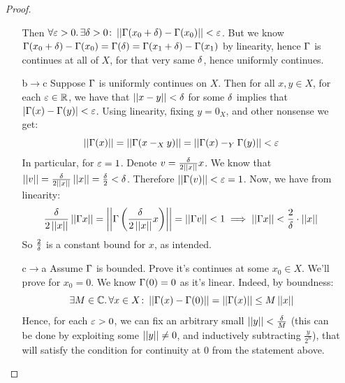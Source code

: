 \documentclass[a4paper]{article}
\begin{document}
\begin{enumerate}
\begin{proof}
\begin{itemize}
				Then $\forall \eg > 0.\, \exists \dg > 0 \co \norm{\Cg(x_0 + \dg) - \Cg(x_0)} < \eg$. But we know $\Cg(x_0 + \dg) - \Cg(x_0) = \Cg(\dg) = \Cg(x_1 + \dg) - \Cg(x_1)$ by linearity, hence $\Cg$ is continues at all of $X$, for that very same $\dg$, hence uniformly continues. 
				\item[b$\to$c]Suppose $\Cg$ is uniformly continues on $X$. Then for all $x, y \in X$, for each $\eg \in \R$, we have that $\left \vert \left \vert x - y \right \vert \right \vert < \delta$ for some $\dg$ implies that $\sof{\Cg(x) - \Cg(y)} < \eg$. Using linearity, fixing $y = 0_X$, and other nonsense we get: 
				\[ \norm{\Cg(x)} = \norm{\Cg(x -_X y)} = \norm{\Cg(x) -_Y \Cg(y)} < \eg \]
				In particular, for $\eg = 1$. Denote $v = \frac{\delta}{2 \left \vert \left \vert x \right \vert \right \vert}x$. We know that $\left \vert \left \vert v \right \vert \right \vert = \frac{\delta}{2\left \vert \left \vert x \right \vert \right \vert} \left \vert \left \vert x \right \vert \right \vert = \frac{\delta}{2} < \delta$. Therefore $\norm{\Cg(v)} < \eg = 1$. Now, we have from linearity: 
				\[ \frac{\delta}{2 \left \vert \left \vert x \right \vert \right \vert}\left \vert \left \vert \Gamma x \right \vert \right \vert = \left \vert \left \vert \Gamma\left ( \frac{\delta}{2 \left \vert \left \vert x \right \vert \right \vert}x \right ) \right \vert \right \vert = \left \vert \left \vert \Gamma v \right \vert \right \vert < 1 \implies \left \vert \left \vert \Gamma x \right \vert \right \vert < \frac{2}{\delta} \cdot \left \vert \left \vert x \right \vert \right \vert \]
				So $\frac{2}{\delta}$ is a constant bound for $x$, as intended. 
				\item[c$\to$a]Assume $\Cg$ is bounded. Prove it's continues at some $x_0 \in X$. 
					We'll prove for $x_0 = 0$. We know $\Gamma(0) = 0$ as it's linear. Indeed, by boundness: 
					\[ \exists M \in \mathbb{C}.\, \forall x \in X \colon  \left \vert \left \vert \Gamma(x) - \Gamma(0) \right \vert \right \vert = \left \vert \left \vert \Gamma(x) \right \vert \right \vert \le M \left \vert \left \vert x \right \vert \right \vert \]
					Hence, for each $\eg > 0$, we can fix an arbitrary small $\left \vert \left \vert y \right \vert \right \vert < \frac{\delta}{M}$ (this can be done by exploiting some $\left \vert \left \vert y \right \vert \right \vert \neq 0$, and inductively subtracting $\frac{y}{2^{n}}$), that will satisfy the condition for continuity at $0$ from the statement above. 
			\end{itemize}
		\end{proof}
	\end{enumerate}
	
\end{document}
